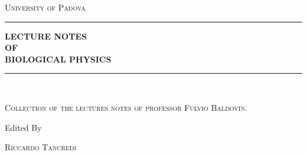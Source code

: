 \begin{titlepage} %

	\newcommand{\HRule}{\rule{\linewidth}{0.5mm}} %
	
	\center %
	
	
	\textsc{\LARGE University of Padova}\vspace{1.5cm} %
	
	
	\HRule \vspace{0.5cm}
	
	\textbf{\LARGE LECTURE NOTES\\ OF\\ BIOLOGICAL PHYSICS\\} %
	\vspace{0.5cm}
	\HRule\\[0.5cm]
	
	\vspace{2\baselineskip} %
	
	
	\textsc{ \small Collection of the lectures notes of professor Fulvio Baldovin. }%
	
	\vspace*{3\baselineskip} %
	
	
	Edited By
	
	\vspace{0.5\baselineskip} %
	
	\textsc{ \Large Riccardo Tancredi \\} %
	
	\vspace{0.5\baselineskip} %
	
	\vspace{2cm}
	

\end{titlepage}
